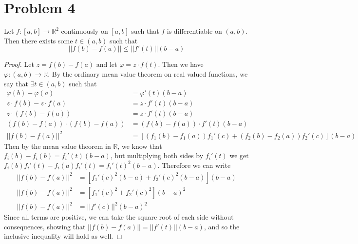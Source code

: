 \documentclass{article}
\theoremstyle{definition}
\begin{document}
\section*{Problem 4}
    \begin{mdframed}
        Let $f: [a,b] \rightarrow \mathbb{R}^2$ continuously on $[a,b]$ such that $f$ is differentiable
        on $(a,b)$. Then there exists some $t \in (a,b)$ such that
        \[
            ||f(b) - f(a)|| \leqslant ||f'(t)|| (b-a)
        \]
    \end{mdframed}
    \begin{proof}
        Let $z = f(b) - f(a)$ and let $\varphi = z \cdot f(t)$. Then we have $\varphi : (a,b) \rightarrow \mathbb{R}$.
        By the ordinary mean value theorem on real valued functions, we say that $\exists t \in (a,b)$ such that 
        \begin{align*}
            \varphi(b) - \varphi(a) & = \varphi ' (t)(b-a)\\
            z \cdot f(b) - z \cdot f(a) & = z \cdot f'(t) (b-a)\\
            z \cdot (f(b) - f(a)) & = z \cdot f'(t) (b-a) \\
            (f(b) - f(a)) \cdot (f(b) - f(a)) &= (f(b) - f(a)) \cdot f'(t) (b-a) \\
            ||f(b)-f(a)||^2 &= [(f_1(b) - f_1(a))f_1'(c) + (f_2(b) - f_2(a))f_2'(c)](b-a)
        \end{align*}
        Then by the mean value theorem in $\mathbb{R}$, we know that $f_i(b) - f_i(b) = f_i'(t)(b-a)$,
        but multiplying both sides by $f_i'(t)$ we get $f_i(b)f_i'(t) - f_i(a)f_i'(t) = f_i'(t)^2(b-a)$.
        Therefore we can write
        \begin{align*}
            ||f(b)-f(a)||^2 &= [f_1'(c)^2(b-a) + f_2'(c)^2(b-a)](b-a) \\
            ||f(b)-f(a)||^2 &= [f_1'(c)^2 + f_2'(c)^2](b-a)^2 \\
            ||f(b)-f(a)||^2 &= ||f'(c)||^2(b-a)^2
        \end{align*}
        Since all terms are positive, we can take the square root of each side without consequences, showing that 
        $||f(b) - f(a)|| = ||f'(t)||(b-a)$, and so the inclusive inequality will hold as well.
    \end{proof}
\end{document}

